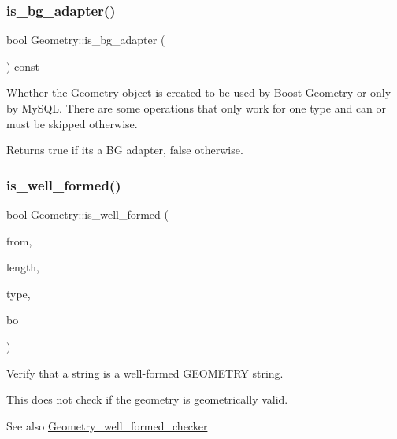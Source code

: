 \subsubsection{\texorpdfstring{is\+\_\+bg\+\_\+adapter()}{is\_bg\_adapter()}}
{\footnotesize\ttfamily bool Geometry\+::is\+\_\+bg\+\_\+adapter (\begin{DoxyParamCaption}{ }\end{DoxyParamCaption}) const\hspace{0.3cm}{\ttfamily [inline]}}

Whether the \mbox{\hyperlink{classGeometry}{Geometry}} object is created to be used by Boost \mbox{\hyperlink{classGeometry}{Geometry}} or only by My\+S\+QL. There are some operations that only work for one type and can or must be skipped otherwise. \begin{DoxyReturn}{Returns}
true if it\textquotesingle{}s a BG adapter, false otherwise. 
\end{DoxyReturn}
\mbox{\label{classGeometry_ae034f775d692619cc4bc8842d34a4cd8}} 
\subsubsection{\texorpdfstring{is\+\_\+well\+\_\+formed()}{is\_well\_formed()}}
{\footnotesize\ttfamily bool Geometry\+::is\+\_\+well\+\_\+formed (\begin{DoxyParamCaption}\item[{const char $\ast$}]{from,  }\item[{size\+\_\+t}]{length,  }\item[{Geometry\+::wkb\+Type}]{type,  }\item[{Geometry\+::wkb\+Byte\+Order}]{bo }\end{DoxyParamCaption})\hspace{0.3cm}{\ttfamily [static]}}

Verify that a string is a well-\/formed G\+E\+O\+M\+E\+T\+RY string.

This does not check if the geometry is geometrically valid.

\begin{DoxySeeAlso}{See also}
\mbox{\hyperlink{classGeometry__well__formed__checker}{Geometry\+\_\+well\+\_\+formed\+\_\+checker}}
\end{DoxySeeAlso}

